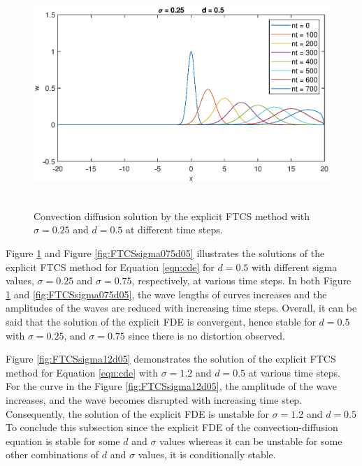\documentclass[letterpaper,12pt]{article}
\begin{document}
\begin{figure}[H] 
	\centering 
	\includegraphics[max height=8.5cm]{graphs/FTCS/ConvectionDiffusion/sigma025d05.eps}
	\caption{Convection diffusion solution by the explicit FTCS method with $\sigma= 0.25$ and $d=0.5$ at different time steps.}
	 \label{fig:FTCSsigma025d05}
\end{figure}

Figure \ref{fig:FTCSsigma025d05} and Figure \ref{fig:FTCSsigma075d05} illustrates the solutions of the explicit FTCS
method for Equation \ref{eqn:cde} for $d=0.5$ with different sigma values, $\sigma= 0.25$ and $\sigma=0.75$,
respectively, at various time steps. In both Figure \ref{fig:FTCSsigma025d05}
and \ref{fig:FTCSsigma075d05}, the wave lengths of curves increases and the amplitudes of the waves are reduced
with increasing time steps. Overall, it can be said that the solution of the explicit FDE is convergent, hence stable 
for $d=0.5$ with $\sigma = 0.25$, and $\sigma = 0.75$ since there is no distortion observed.
\vspace{1em}

Figure \ref{fig:FTCSsigma12d05} demonstrates the solution of the explicit FTCS
method for Equation \ref{eqn:cde} with $\sigma= 1.2$ and $d=0.5$ at various time steps. For the curve in the
Figure \ref{fig:FTCSsigma12d05}, the amplitude of the wave increases, and the wave becomes disrupted with
increasing time step. Consequently, the solution of the explicit FDE is unstable for $\sigma=1.2$ and $d=0.5$\\
\indent To conclude this subsection since the explicit FDE of the convection-diffusion equation is stable for some $d$ 
and $\sigma$ values whereas it can be unstable for some other combinations of $d$ and $\sigma$ values, it is conditionally stable.
\end{document}
